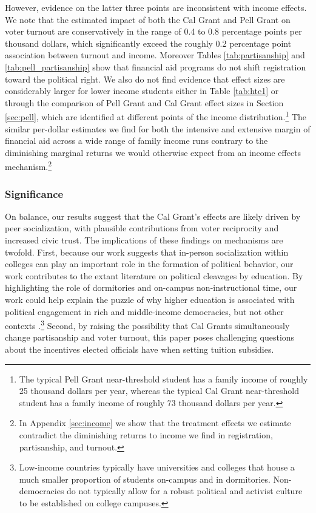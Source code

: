 \documentclass[12pt,letterpaper,oneside]{book}
\begin{document}
However, evidence on the latter three points are inconsistent with income effects. We note that the estimated impact of both the Cal Grant and Pell Grant on voter turnout are conservatively in the range of 0.4 to 0.8 percentage points per thousand dollars, which significantly exceed the roughly 0.2 percentage point association between turnout and income. Moreover Tables \ref{tab:partisanship} and \ref{tab:pell_partisanship} show that financial aid programs do not shift registration toward the political right. We also do not find evidence that effect sizes are considerably larger for lower income students either in Table \ref{tab:hte1} or through the comparison of Pell Grant and Cal Grant effect sizes in Section \ref{sec:pell}, which are identified at different points of the income distribution.\footnote{The typical Pell Grant near-threshold student has a family income of roughly 25 thousand dollars per year, whereas the typical Cal Grant near-threshold student has a family income of roughly 73 thousand dollars per year.} The similar per-dollar estimates we find for both the intensive and extensive margin of financial aid across a wide range of family income runs contrary to the diminishing marginal returns we would otherwise expect from an income effects mechanism.\footnote{In Appendix \ref{sec:income} we show that the treatment effects we estimate contradict the diminishing returns to income we find in registration, partisanship, and turnout.}

\subsubsection{Significance}
On balance, our results suggest that the Cal Grant's effects are likely driven by peer socialization, with plausible contributions from voter reciprocity and increased civic trust. The implications of these findings on mechanisms are twofold. First, because our work suggests that in-person socialization within colleges can play an important role in the formation of political behavior, our work contributes to the extant literature on political cleavages by education. By highlighting the role of dormitories and on-campus non-instructional time, our work could help explain the puzzle of why higher education is associated with political engagement in rich and middle-income democracies, but not other contexts \citep{krishna_poor_2008,gallego_understanding_2010,gethin_political_2021}.\footnote{Low-income countries typically have universities and colleges that house a much smaller proportion of students on-campus and in dormitories. Non-democracies do not typically allow for a robust political and activist culture to be established on college campuses.} Second, by raising the possibility that Cal Grants simultaneously change partisanship and voter turnout, this paper poses challenging questions about the incentives elected officials have when setting tuition subsidies.
\end{document}
